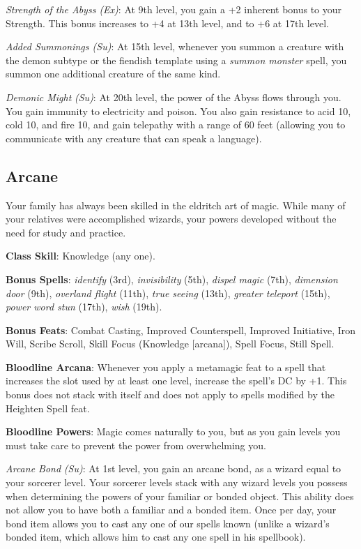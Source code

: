 \textit{Strength of the Abyss (Ex)}: At 9th level, you gain a +2 inherent bonus to your Strength. This bonus increases to +4 at 13th level, and to +6 at 17th level.
				
\textit{Added Summonings (Su)}: At 15th level, whenever you summon a creature with the demon subtype or the fiendish template using a \textit{summon monster} spell, you summon one additional creature of the same kind.
				
\textit{Demonic Might} \textit{(Su)}: At 20th level, the power of the Abyss flows through you. You gain immunity to electricity and poison. You also gain resistance to acid 10, cold 10, and fire 10, and gain telepathy with a range of 60 feet (allowing you to communicate with any creature that can speak a language).
				
\subsection{Arcane}

				
Your family has always been skilled in the eldritch art of magic. While many of your relatives were accomplished wizards, your powers developed without the need for study and practice.
				
\textbf{Class Skill}: Knowledge (any one).
				
\textbf{Bonus Spells}: \textit{identify} (3rd), \textit{invisibility} (5th), \textit{dispel magic} (7th), \textit{dimension door }(9th), \textit{overland flight }(11th), \textit{true seeing} (13th), \textit{greater teleport} (15th), \textit{power word stun} (17th), \textit{wish} (19th).
				
\textbf{Bonus Feats}: Combat Casting, Improved Counterspell, Improved Initiative, Iron Will, Scribe Scroll, Skill Focus (Knowledge \mbox{$[$}arcana\mbox{$]$}), Spell Focus, Still Spell.
				
\textbf{Bloodline Arcana}: Whenever you apply a metamagic feat to a spell that increases the slot used by at least one level, increase the spell's DC by +1. This bonus does not stack with itself and does not apply to spells modified by the Heighten Spell feat.
				
\textbf{Bloodline Powers}: Magic comes naturally to you, but as you gain levels you must take care to prevent the power from overwhelming you. 
				
\textit{Arcane Bond} \textit{(Su)}: At 1st level, you gain an arcane bond, as a wizard equal to your sorcerer level. Your sorcerer levels stack with any wizard levels you possess when determining the powers of your familiar or bonded object. This ability does not allow you to have both a familiar and a bonded item. Once per day, your bond item allows you to cast any one of our spells known (unlike a wizard's bonded item, which allows him to cast any one spell in his spellbook).
				
